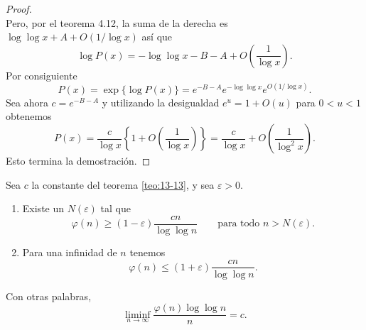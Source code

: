 \documentclass[12pt,a4paper]{book}
\begin{document}
\begin{proof}
\begin{equation*}
        \end{equation*}
        Pero, por el teorema 4.12, la suma de la derecha es $\log\log x+A+O(1/\log x)$
        así que
        \begin{equation*}
            \log P(x)=-\log\log x-B-A+O\left(\frac{1}{\log x}\right).
        \end{equation*}
        Por consiguiente
        \begin{equation*}
            P(x)=\exp\{\log P(x)\}=e^{-B-A}e^{-\log\log x}e^{O(1/\log x)}.
        \end{equation*}
        Sea ahora $c=e^{-B-A}$ y utilizando la desigualdad $e^{u}=1+O(u)$ para $0<u<1$ obtenemos
        \begin{equation*}
            P(x)=\frac{c}{\log x}\left\{1+O\left(\frac{1}{\log x}\right)\right\}=\frac{c}{\log x}+O\left(\frac{1}{\log^{2}x}\right).
        \end{equation*}
        Esto termina la demostración.
    \end{proof}

    \begin{teorema}\label{teo:13-14}
        Sea $c$ la constante del teorema \ref{teo:13-13}, y sea $\varepsilon>0$.
        \begin{enumerate}
            \item[(a)] Existe un $N(\varepsilon)$ tal que
            \begin{equation*}
                \varphi(n)\geq(1-\varepsilon)\frac{cn}{\log\log n}\qquad\text{para todo }n>N(\varepsilon).
            \end{equation*}
            \item[(b)] Para una infinidad de $n$ tenemos
            \begin{equation*}
                \varphi(n)\leq(1+\varepsilon)\frac{cn}{\log\log n}.
            \end{equation*}
        \end{enumerate}
        Con otras palabras,
        \begin{equation*}
            \liminf_{n\to\infty}\frac{\varphi(n)\log\log n}{n}=c.
        \end{equation*}
    \end{teorema}
\end{document}
